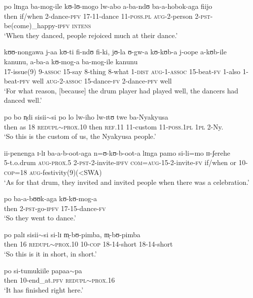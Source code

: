 \begin{exe}
\ex \gll po lɪnga ba-mog-ile kʊ-lʊ-mogo lw-abo a-ba-ndʊ ba-a-hobok-aga fiijo\\
then if/when 2-dance-\textsc{pfv} 17-11-dance 11-\textsc{poss.pl} \textsc{aug}-2-person 2-\textsc{pst}-be(come)\_happy-\textsc{ipfv} \textsc{intens}\\
\glt \lq When they danced, people rejoiced much at their dance.'

\ex \gll kʊʊ-nongawa j-aa kʊ-ti fi-ndʊ fi-ki, jʊ-la ʊ-gw-a kʊ-kʊb-a j-oope a-kʊb-ile kanunu, a-ba-a kʊ-mog-a ba-mog-ile kanunu\\
17-issue(9) 9-\textsc{assoc} 15-say 8-thing 8-what 1-\textsc{dist} \textsc{aug}-1-\textsc{assoc} 15-beat-\textsc{fv} 1-also 1-beat-\textsc{pfv} well \textsc{aug}-2-\textsc{assoc} 15-dance-\textsc{fv} 2-dance-\textsc{pfv} well\\
\glt \lq For what reason, [because] the drum player had played well, the dancers had danced well.'

\ex \gll po bo n̩di sisii$\sim$si po lo lw-iho lw-ɪtʊ twe ba-Nyakyusa\\
then as 18 \textsc{redupl}$\sim$\textsc{prox.10} then \textsc{ref.11} 11-custom 11-\textsc{poss.1pl} \textsc{1pl} 2-Ny.\\
\glt \lq So this is the custom of us, the Nyakyusa people.'

\ex \gll ii-penenga ɪ-lɪ ba-a-b-oot-aga n=ʊ-kʊ-b-oot-a lɪnga pamo si-li=mo ɪɪ-ʃerehe\\
5-t.o.drum \textsc{aug}-\textsc{prox.5} 2-\textsc{pst}-2-invite-\textsc{ipfv} \textsc{com}=\textsc{aug}-15-2-invite-\textsc{fv} if/when or 10-\textsc{cop}=18 \textsc{aug}-festivity(9)(<SWA)\\
\glt \lq As for that drum, they invited and invited people when there was a celebration.'

\ex \gll po ba-a-bʊʊk-aga kʊ-kʊ-mog-a\\
then 2-\textsc{pst}-go-\textsc{ipfv} 17-15-dance-\textsc{fv}\\
\glt \lq So they went to dance.'

\ex \gll po palɪ sisii$\sim$si si-lɪ m̩-bʊ-pimba, m̩-bʊ-pimba\\
then 16  \textsc{redupl}$\sim$\textsc{prox.10} 10-\textsc{cop} 18-14-short 18-14-short\\
\glt \lq So this is it in short, in short.'

\ex \gll po si-tumukiile papaa$\sim$pa\\
then 10-end\_at.\textsc{pfv} \textsc{redupl}$\sim$\textsc{prox.16}\\
\glt \lq It has finished right here.'

\end{exe}

